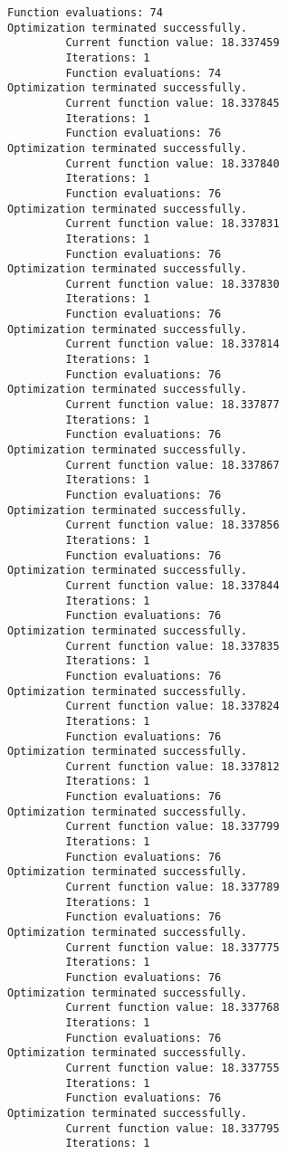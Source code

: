 \documentclass[11pt]{article}
\begin{document}
\begin{Verbatim}[commandchars=\\\{\}]
         Function evaluations: 74
Optimization terminated successfully.
         Current function value: 18.337459
         Iterations: 1
         Function evaluations: 74
Optimization terminated successfully.
         Current function value: 18.337845
         Iterations: 1
         Function evaluations: 76
Optimization terminated successfully.
         Current function value: 18.337840
         Iterations: 1
         Function evaluations: 76
Optimization terminated successfully.
         Current function value: 18.337831
         Iterations: 1
         Function evaluations: 76
Optimization terminated successfully.
         Current function value: 18.337830
         Iterations: 1
         Function evaluations: 76
Optimization terminated successfully.
         Current function value: 18.337814
         Iterations: 1
         Function evaluations: 76
Optimization terminated successfully.
         Current function value: 18.337877
         Iterations: 1
         Function evaluations: 76
Optimization terminated successfully.
         Current function value: 18.337867
         Iterations: 1
         Function evaluations: 76
Optimization terminated successfully.
         Current function value: 18.337856
         Iterations: 1
         Function evaluations: 76
Optimization terminated successfully.
         Current function value: 18.337844
         Iterations: 1
         Function evaluations: 76
Optimization terminated successfully.
         Current function value: 18.337835
         Iterations: 1
         Function evaluations: 76
Optimization terminated successfully.
         Current function value: 18.337824
         Iterations: 1
         Function evaluations: 76
Optimization terminated successfully.
         Current function value: 18.337812
         Iterations: 1
         Function evaluations: 76
Optimization terminated successfully.
         Current function value: 18.337799
         Iterations: 1
         Function evaluations: 76
Optimization terminated successfully.
         Current function value: 18.337789
         Iterations: 1
         Function evaluations: 76
Optimization terminated successfully.
         Current function value: 18.337775
         Iterations: 1
         Function evaluations: 76
Optimization terminated successfully.
         Current function value: 18.337768
         Iterations: 1
         Function evaluations: 76
Optimization terminated successfully.
         Current function value: 18.337755
         Iterations: 1
         Function evaluations: 76
Optimization terminated successfully.
         Current function value: 18.337795
         Iterations: 1

\end{Verbatim}
\end{document}

